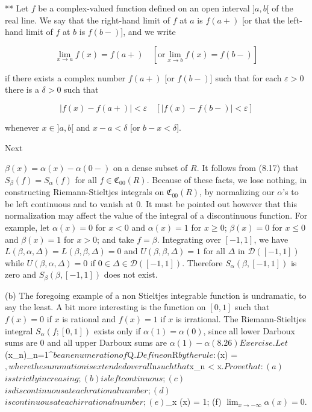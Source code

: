 ** Let $f$ be a complex-valued function defined on an open interval $]a, b[$ of the real line. We say that the right-hand limit of $f$ at $a$ is $f(a+)$ [or that the left-hand limit of $f$ at $b$ is $f(b-)$], and we write

$$\lim_{x \to a} f(x) = f(a+) \quad [\text{or} \lim_{x \to b} f(x) = f(b-)]$$

if there exists a complex number $f(a+)$ [or $f(b-)$] such that for each $\varepsilon > 0$ there is a $\delta > 0$ such that

$$|f(x) - f(a+)| < \varepsilon \quad [|f(x) - f(b-)| < \varepsilon]$$

whenever $x \in ]a, b[$ and $x - a < \delta$ [or $b - x < \delta$].

Next

$\beta(x) = \alpha(x) - \alpha(0-)$ on a dense subset of $R$. It follows from (8.17) that $S_{\beta}(f) = S_{\alpha}(f)$ for all $f \in \mathfrak{C}_{00}(R)$. Because of these facts, we lose nothing, in constructing Riemann-Stieltjes integrals on $\mathfrak{C}_{00}(R)$, by normalizing our $\alpha$'s to be left continuous and to vanish at 0. It must be pointed out however that this normalization may affect the value of the integral of a discontinuous function. For example, let $\alpha(x) = 0$ for $x < 0$ and $\alpha(x) = 1$ for $x \geq 0$; $\beta(x) = 0$ for $x \leq 0$ and $\beta(x) = 1$ for $x > 0$; and take $f = \beta$. Integrating over $[-1, 1]$, we have $L(\beta, \alpha, \Delta) = L(\beta, \beta, \Delta) = 0$ and $U(\beta, \beta, \Delta) = 1$ for all $\Delta$ in $\mathcal{D}([-1, 1])$ while $U(\beta, \alpha, \Delta) = 0$ if $0 \in \Delta \in \mathcal{D}([-1, 1])$. Therefore $S_{\alpha}(\beta, [-1, 1])$ is zero and $S_{\beta}(\beta, [-1, 1])$ does not exist.

(b) The foregoing example of a non Stieltjes integrable function is undramatic, to say the least. A bit more interesting is the function on $[0, 1]$ such that $f(x) = 0$ if $x$ is rational and $f(x) = 1$ if $x$ is irrational. The Riemann-Stieltjes integral $S_{\alpha}(f; [0, 1])$ exists only if $\alpha(1) = \alpha(0)$, since all lower Darboux sums are 0 and all upper Darboux sums are $\alpha(1) - \alpha

(8.26) Exercise. Let $(x_n)_{n=1}^{\infty}$ be an enumeration of $Q$. Define $\alpha$ on $R$ by the rule: $\alpha(x) = \sum {}$, where the summation is extended over all $n$ such that $x_n < x$. Prove that:

(a) $\alpha$ is strictly increasing;
(b) $\alpha$ is left continuous;
(c) $\alpha$ is discontinuous at each rational number;
(d) $\alpha$ is continuous at each irrational number;
(e) $\lim_{x \to \infty} \alpha(x) = 1;
(f) $\lim_{x \to -\infty} \alpha(x) = 0$.

